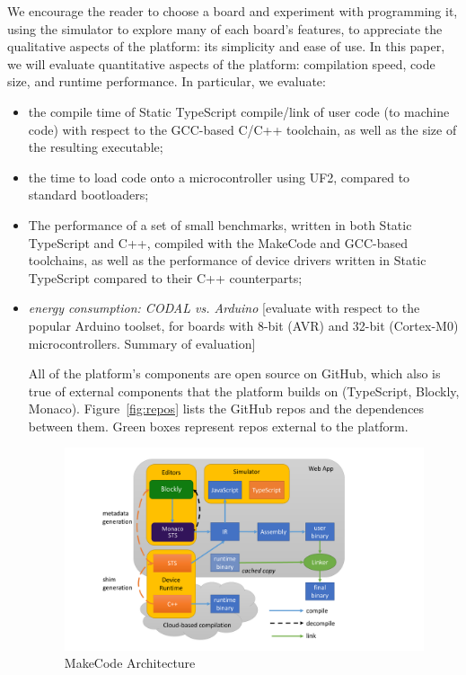 We encourage the reader to choose a board and experiment with programming it, using the simulator to explore many 
of each board's features, to appreciate the qualitative aspects of the platform: its simplicity and ease of use.  In this 
paper, we will evaluate quantitative aspects of the platform: 
compilation speed, code size, and runtime performance.  In particular, we evaluate:
\begin{itemize}
\item the compile time of Static TypeScript compile/link of user code (to machine code) with respect 
      to the GCC-based C/C++ toolchain, as well as the size of the resulting executable;
\item the time to load code onto a microcontroller using UF2, compared to standard bootloaders; 
\item The performance of a set of small benchmarks, written in both Static TypeScript and C++,
      compiled with the MakeCode and GCC-based toolchains, as well as the performance of device drivers
      written in Static TypeScript compared to their C++ counterparts;
\item \emph{energy consumption: CODAL vs. Arduino}
[evaluate with respect to the popular Arduino toolset, for boards with 8-bit (AVR) and 32-bit (Cortex-M0) microcontrollers. 
Summary of evaluation]

All of the platform's components are open source on GitHub, 
which also is true of external components that the platform
builds on (TypeScript, Blockly, Monaco). Figure~\ref{fig:repos}
lists the GitHub repos and the dependences between them. Green
boxes represent repos external to the platform.

\begin{figure}[t]
      \includegraphics[width=5.5in]{makecodeFig.pdf}
  \caption{\label{fig:makecode}MakeCode Architecture}
  \end{figure}
  

\end{itemize}

